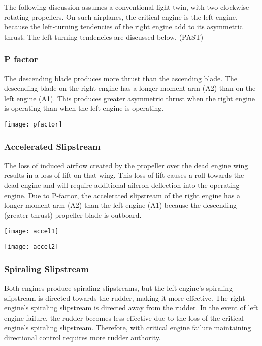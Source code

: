 The following discussion assumes a conventional light twin, with two clockwise-rotating propellers. On such
airplanes, the critical engine is the left engine, because the left-turning tendencies of the right engine add to its
asymmetric thrust. The left turning tendencies are discussed below. (PAST)

\subsubsection{P factor}

The descending blade produces more thrust than the ascending blade. The descending blade on the right engine has
a longer moment arm (A2) than on the left engine (A1). This produces greater asymmetric thrust when the right
engine is operating than when the left engine is operating.

\begin{center}
\texttt{[image: pfactor]}
\end{center}

\subsubsection{Accelerated Slipstream}

The loss of induced airflow created by the propeller over the dead engine wing results in a
loss of lift on that wing. This loss of lift causes a roll towards the dead engine and will
require additional aileron deflection into the operating engine. Due to P-factor, the
accelerated slipstream of the right engine has a longer moment-arm (A2) than the left
engine (A1) because the descending (greater-thrust) propeller blade is outboard.

\begin{center}
\texttt{[image: accel1]}
\end{center}

\begin{center}
\texttt{[image: accel2]}
\end{center}

\subsubsection{Spiraling Slipstream}

Both engines produce spiraling slipstreams, but the left engine’s spiraling slipstream is directed towards the rudder, making it more effective. The right engine’s spiraling slipstream is directed away from the rudder. In the event of
left engine failure, the rudder becomes less effective due to the loss of the critical engine’s spiraling slipstream.
Therefore, with critical engine failure maintaining directional control requires more rudder authority.


